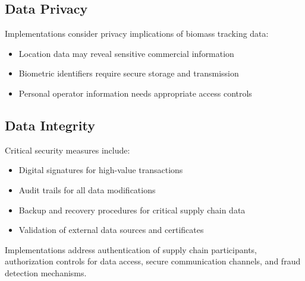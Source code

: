 
\subsection{Data Privacy}
\label{sec:data-privacy}

Implementations \SHOULD{} consider privacy implications of biomass tracking data:

\begin{itemize}
    \item Location data may reveal sensitive commercial information
    \item Biometric identifiers require secure storage and transmission
    \item Personal operator information needs appropriate access controls
\end{itemize}

\subsection{Data Integrity}
\label{sec:data-integrity}

Critical security measures include:

\begin{itemize}
    \item Digital signatures for high-value transactions
    \item Audit trails for all data modifications
    \item Backup and recovery procedures for critical supply chain data
    \item Validation of external data sources and certificates
\end{itemize}

\begin{important}[title=Security Implementation Requirements]
Implementations \MUST{} address authentication of supply chain participants, authorization controls for data access, secure communication channels, and fraud detection mechanisms.
\end{important}